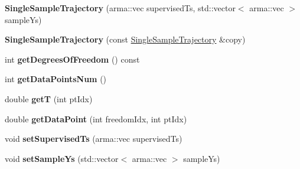 \begin{DoxyCompactItemize}
\item 
{\bfseries Single\+Sample\+Trajectory} (arma\+::vec supervised\+Ts, std\+::vector$<$ arma\+::vec $>$ sample\+Ys)\hypertarget{classkukadu_1_1SingleSampleTrajectory_a1b926fb1a17e46259c12cb26133c330a}{}\label{classkukadu_1_1SingleSampleTrajectory_a1b926fb1a17e46259c12cb26133c330a}

\item 
{\bfseries Single\+Sample\+Trajectory} (const \hyperlink{classkukadu_1_1SingleSampleTrajectory}{Single\+Sample\+Trajectory} \&copy)\hypertarget{classkukadu_1_1SingleSampleTrajectory_af814c665fa3fe6bdbaace8ca1abc66ac}{}\label{classkukadu_1_1SingleSampleTrajectory_af814c665fa3fe6bdbaace8ca1abc66ac}

\item 
int {\bfseries get\+Degrees\+Of\+Freedom} () const \hypertarget{classkukadu_1_1SingleSampleTrajectory_acafc41e33a17cd3e2178460b04535f85}{}\label{classkukadu_1_1SingleSampleTrajectory_acafc41e33a17cd3e2178460b04535f85}

\item 
int {\bfseries get\+Data\+Points\+Num} ()\hypertarget{classkukadu_1_1SingleSampleTrajectory_a54d07b45ee0b240d78c44bebb6b8818c}{}\label{classkukadu_1_1SingleSampleTrajectory_a54d07b45ee0b240d78c44bebb6b8818c}

\item 
double {\bfseries getT} (int pt\+Idx)\hypertarget{classkukadu_1_1SingleSampleTrajectory_a96c8f92caeaa68108d16f99dd6cc190f}{}\label{classkukadu_1_1SingleSampleTrajectory_a96c8f92caeaa68108d16f99dd6cc190f}

\item 
double {\bfseries get\+Data\+Point} (int freedom\+Idx, int pt\+Idx)\hypertarget{classkukadu_1_1SingleSampleTrajectory_af9da2ca21bfb86dec37b3983bc4f42ec}{}\label{classkukadu_1_1SingleSampleTrajectory_af9da2ca21bfb86dec37b3983bc4f42ec}

\item 
void {\bfseries set\+Supervised\+Ts} (arma\+::vec supervised\+Ts)\hypertarget{classkukadu_1_1SingleSampleTrajectory_abdf363f6319cec5daa413ae03872652c}{}\label{classkukadu_1_1SingleSampleTrajectory_abdf363f6319cec5daa413ae03872652c}

\item 
void {\bfseries set\+Sample\+Ys} (std\+::vector$<$ arma\+::vec $>$ sample\+Ys)\hypertarget{classkukadu_1_1SingleSampleTrajectory_abd2bcbdb8cb5bf73c1618b8304553923}{}\label{classkukadu_1_1SingleSampleTrajectory_abd2bcbdb8cb5bf73c1618b8304553923}


\end{DoxyCompactItemize}
